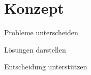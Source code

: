 \chapter{Konzept}
\label{sec:Konzept}

Probleme unterscheiden

Lösungen darstellen

Entscheidung unterstützen


